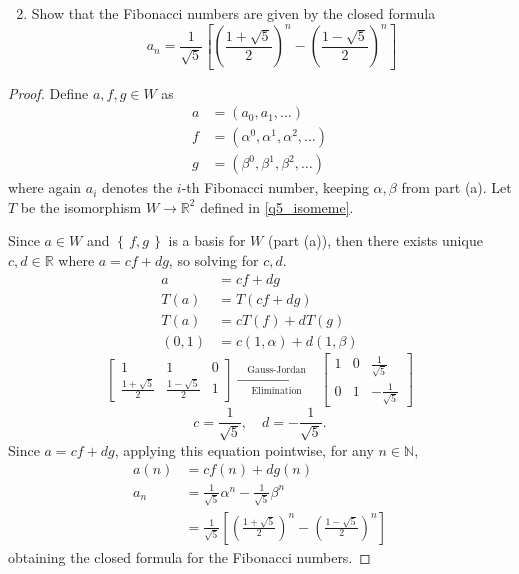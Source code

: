 \documentclass[11pt]{article}
\theoremstyle{definition}
\numberwithin{lemma}{problem}
\numberwithin{equation}{problem}
\newcommand{\N}{\mathbb{N}}
\newcommand{\R}{\mathbb{R}}
\newcommand{\set}[1]{\left\{\,#1\,\right\}}
\begin{document}
\newpage
\begin{enumerate}[label=(\alph*)] \setcounter{enumi}{1}
    \item Show that the Fibonacci numbers are given by the closed formula
        \[
            a_n = \frac{1}{\sqrt{5}}\left[
                \left( \frac{1+\sqrt{5}}{2} \right)^n   -
                \left( \frac{1-\sqrt{5}}{2} \right)^n
                \right]
        \]
\end{enumerate}
\begin{proof}
    Define $a, f, g\in W$ as
    \begin{align*}
        a &= (a_0, a_1, \dots)  \\
        f &= (\alpha^0,\alpha^1,\alpha^2,\dots) \\
        g &= (\beta^0,\beta^1,\beta^2,\dots)
    \end{align*}
    where again $a_i$ denotes the $i$-th Fibonacci number, keeping $\alpha, \beta$ from part (a).
    Let $T$ be the isomorphism $W\to \R^2$ defined in \ref{q5_isomeme}.

    Since $a\in W$ and $\set{f,g}$ is a basis for $W$ (part (a)),
    then there exists unique $c,d\in \R$ where $a = cf + dg$, so solving for $c,d$.
    \begin{align*}
        a &= cf + dg    \\
        T(a) &= T(cf + dg)    \\
        T(a) &= cT(f) + dT(g)    \\
        (0,1) &= c(1,\alpha) + d(1,\beta)
    \end{align*}
    \[
        \left[
            \begin{array}{cc|c}
                1 & 1 & 0   \\
                \frac{1+\sqrt{5}}{2} & \frac{1-\sqrt{5}}{2} & 1
            \end{array}
            \right]
        \xrightarrow[\text{Elimination}]{\quad \text{Gauss-Jordan}\quad }
        \left[
            \begin{array}{cc|c}
                1 & 0 & \frac{1}{\sqrt{5}}   \\
                0 & 1 & -\frac{1}{\sqrt{5}}
            \end{array}
            \right]
    \]
    $$c = \frac{1}{\sqrt{5}},\quad d = -\frac{1}{\sqrt{5}}.$$
    Since $a = cf + dg$, applying this equation pointwise, for any $n \in \N$,
    \begin{align*}
        a(n) &= cf(n) + dg(n)    \\
        a_n &= \frac{1}{\sqrt{5}} \alpha^n - \frac{1}{\sqrt{5}} \beta^n    \\
        &= \frac{1}{\sqrt{5}} \left[
            \left( \frac{1+\sqrt{5}}{2} \right)^n   -
            \left( \frac{1-\sqrt{5}}{2} \right)^n
            \right]
    \end{align*}
    obtaining the closed formula for the Fibonacci numbers.
\end{proof}
\end{document}
